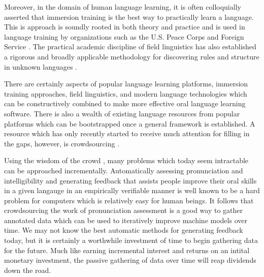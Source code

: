 Moreover, in the domain of human language learning, it is often colloquially asserted that immersion training is the best way to practically learn a language. This is approach is soundly rooted in both theory and practice and is used in language training by organizations such as the U.S. Peace Corps and Foreign Service \cite{swain1998interaction} \cite{genesee1987learning} \cite{johnson1997immersion} \cite{howard2005second} \cite{leeds1990notes}. The practical academic discipline of field linguistics has also established a rigorous and broadly applicable methodology for discovering rules and structure in unknown languages \cite{seuren1966grammar} \cite{crowley2007field} \cite{lawler1998using}. 

There are certainly aspects of popular language learning platforms, immersion training approaches, field linguistics, and modern language technologies which can be constructively combined to make more effective oral language learning software. There is also a wealth of existing language resources from popular platforms which can be bootstrapped once a general framework is established. A resource which has only recently started to receive much attention for filling in the gaps, however, is crowdsourcing \cite{eskenazi2013crowdsourcing} \cite{parent2011speaking} \cite{callison2010creating}.

Using the wisdom of the crowd \cite{surowiecki2005wisdom}, many problems which today seem intractable can be approached incrementally. Automatically assessing pronunciation and intelligibility and generating feedback that assists people improve their oral skills in a given langauge in an empirically verifiable manner is well known to be a hard problem for computers which is relatively easy for human beings. It follows that crowdsourcing the work of pronunciation assessment is a good way to gather annotated data which can be used to iteratively improve machine models over time. We may not know the best automatic methods for generating feedback today, but it is certainly a worthwhile investment of time to begin gathering data for the future. Much like earning incremental interest and returns on an intital monetary investment, the passive gathering of data over time will reap dividends down the road.




